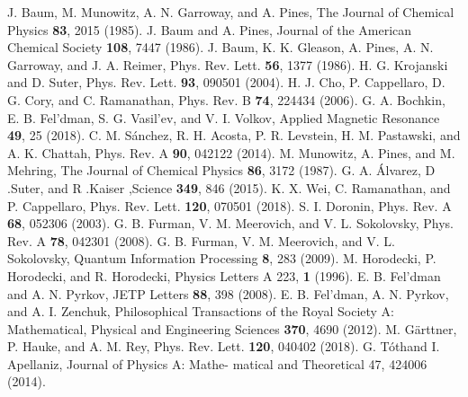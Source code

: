 \documentclass[%
 reprint,
superscriptaddress,
 amsmath,amssymb,
]{revtex4-2}
\begin{document}
%
%
%
\begin{thebibliography}{31}
   J. Baum, M. Munowitz, A. N. Garroway, and A. Pines, The Journal of Chemical Physics {\bf 83}, 2015 (1985).
    J. Baum and A. Pines, Journal of the American Chemical Society {\bf 108}, 7447 (1986).
    J. Baum, K. K. Gleason, A. Pines, A. N. Garroway, and J. A. Reimer, Phys. Rev. Lett. {\bf 56}, 1377 (1986).
    H. G. Krojanski and D. Suter, Phys. Rev. Lett. {\bf 93}, 090501 (2004).
    H. J. Cho, P. Cappellaro, D. G. Cory, and C. Ramanathan, Phys. Rev. B {\bf 74}, 224434 (2006).
    G. A. Bochkin, E. B. Fel'dman, S. G. Vasil'ev, and V. I. Volkov, Applied Magnetic Resonance {\bf 49}, 25 (2018).
    C. M. S{\'a}nchez, R. H. Acosta, P. R. Levstein, H. M.
    Pastawski, and A. K. Chattah, Phys. Rev. A {\bf 90}, 042122
    (2014).
    M. Munowitz, A. Pines, and M. Mehring, The Journal of
    Chemical Physics {\bf 86}, 3172 (1987).
    G. A. {\'A}lvarez, D .Suter, and R .Kaiser ,Science {\bf 349}, 846 (2015).
    K. X. Wei, C. Ramanathan, and P. Cappellaro, Phys.
    Rev. Lett. {\bf 120}, 070501 (2018).
    S. I. Doronin, Phys. Rev. A {\bf 68}, 052306 (2003).
    G. B. Furman, V. M. Meerovich, and V. L. Sokolovsky,
    Phys. Rev. A {\bf 78}, 042301 (2008).
    G. B. Furman, V. M. Meerovich, and V. L. Sokolovsky,
    Quantum Information Processing {\bf 8}, 283 (2009).
    M. Horodecki, P. Horodecki, and R. Horodecki, Physics
    Letters A 223, {\bf 1} (1996).
    E. B. Fel'dman and A. N. Pyrkov, JETP Letters {\bf 88}, 398
    (2008).
    E. B. Fel'dman, A. N. Pyrkov, and A. I. Zenchuk, Philosophical Transactions of the Royal Society A: Mathematical, Physical and Engineering Sciences {\bf 370}, 4690 (2012).
    M. G{\"a}rttner, P. Hauke, and A. M. Rey, Phys. Rev. Lett. {\bf 120}, 040402 (2018).
    G. T{\'o}thand I. Apellaniz, Journal of Physics A: Mathe- matical and Theoretical 47, 424006 (2014).

\end{thebibliography}
\end{document}
